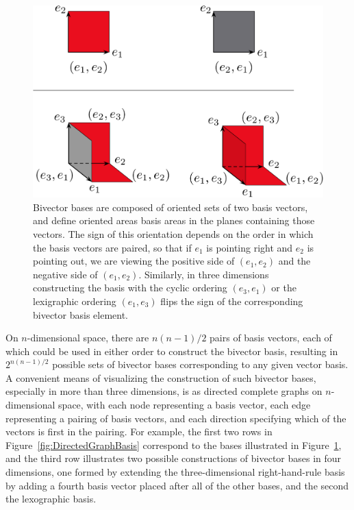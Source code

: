 \documentclass[11pt]{article}
\newcommand{\bv}[1][]{e_{#1}}
\newcommand{\bp}[2]{(#1,#2)}
\begin{document}
\begin{figure}[tbp]
\begin{center}
\includegraphics[width=.75\textwidth]{Low-dimensionalbases}
\caption{Bivector bases are composed of oriented sets of two basis vectors, and define oriented areas basis areas in the planes containing those vectors. The sign of this orientation depends on the order in which the basis vectors are paired, so that if $\bv[1]$ is pointing right and $\bv[2]$ is pointing out, we are viewing the positive side of $\bp{\bv[1]}{\bv[2]}$ and the negative side of $\bp{\bv[1]}{\bv[2]}$. Similarly, in three dimensions constructing the basis with the cyclic ordering $\bp{\bv[3]}{\bv[1]}$ or the lexigraphic ordering $\bp{\bv[1]}{\bv[3]}$ flips the sign of the corresponding bivector basis element.}
\label{fig:lowdimensionalbases}
\end{center}
\end{figure}


On $n$-dimensional space, there are $n(n-1)/2$ pairs of basis vectors, each of which could be used in either order to construct the bivector basis, resulting in $2^{n(n-1)/2}$ possible sets of bivector bases corresponding to any given vector basis. A convenient means of visualizing the construction of such bivector bases, especially in more than three dimensions, is as directed complete graphs on $n$-dimensional space, with each node representing a basis vector, each edge representing a pairing of basis vectors, and each direction specifying which of the vectors is first in the pairing. For example, the first two rows in Figure~\ref{fig:DirectedGraphBasis} correspond to the bases illustrated in Figure~\ref{fig:lowdimensionalbases}, and the third row illustrates two possible constructions of bivector bases in four dimensions, one formed by extending the three-dimensional right-hand-rule basis by adding a fourth basis vector placed after all of the other bases, and the second the lexographic basis.
\end{document}
